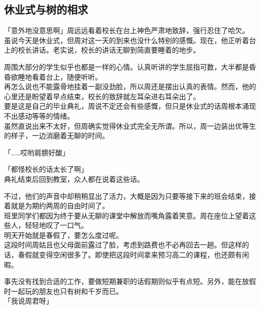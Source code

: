\subsection{休业式与树的相求}

「意外地没意思啊」周远远看着校长在台上神色严肃地致辞，强行忍住了哈欠。\\

虽说今天是休业式，但周对这一天的到来也没什么特别的感慨。现在，他正听着台上的校长讲话。老实说，校长的讲话无聊到简直要睡着的地步。

周围大部分的学生似乎也都是一样的心情。认真听讲的学生屈指可数，大半都是昏昏欲睡地看着台上，随便听听。\\

再怎么说也不能露骨地挂着一副没劲脸，所以周还是摆出认真的表情。然而，他的心里还是盼望着早点结束，校长的致辞就左耳朵进右耳朵出了。\\

要是这是自己的毕业典礼，周说不定还会有些感慨，但只是休业式的话周根本涌现不出感动等等的情绪。\\

虽然直说出来不太好，但周确实觉得休业式完全无所谓。所以，周一边装出优等生的样子，一边消磨着无聊的时间。\\

\vspace{2\baselineskip}

「……哎哟肩膀好酸」

「都怪校长的话太长了啊」\\

典礼结束后回到教室，众人都在说着这些话。

不过，他们的声音中却稍稍显出了活力，大概是因为只要等接下来的班会结束，接着就是为期约两周的自由时间了。\\

班里同学们都因为终于要从无聊的课堂中解放而嘴角露着笑意。周在座位上望着这些人，轻轻地叹了一口气。\\

明天开始就是春假了，要怎么度过呢。\\

这段时间周姑且也父母面前露过了脸，考虑到路费也不必再回去一趟。但这样的话，春假就变得空闲很多了。即使把这段时间拿来预习高二的课程，也还颇有闲暇。

事先没有找到合适的工作，要做短期兼职的话假期则似乎有点短。另外，能在放假时一起玩的朋友也只有树和千岁而已。\\

「我说周君呀」\\

